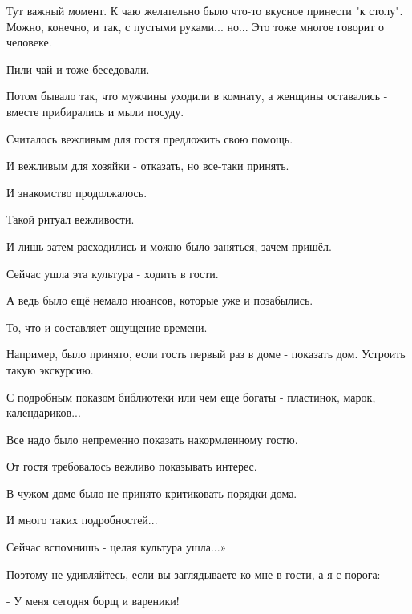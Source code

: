 Тут важный момент. К чаю желательно было что-то вкусное принести "к столу".
Можно, конечно, и так, с пустыми руками... но... Это тоже многое говорит о
человеке.

Пили чай и тоже беседовали.

Потом бывало так, что мужчины уходили в комнату, а женщины оставались - вместе
прибирались и мыли посуду.

Считалось вежливым для гостя предложить свою помощь.

И вежливым для хозяйки - отказать, но все-таки принять.

И знакомство продолжалось.

Такой ритуал вежливости.

И лишь затем расходились и можно было заняться, зачем пришёл.

Сейчас ушла эта культура - ходить в гости.

А ведь было ещё немало нюансов, которые уже и позабылись.

То, что и составляет ощущение времени.

Например, было принято, если гость первый раз в доме - показать дом. Устроить
такую экскурсию. 

С подробным показом библиотеки или чем еще богаты - пластинок, марок,
календариков...

Все надо было непременно показать накормленному гостю.

От гостя требовалось вежливо показывать интерес.

В чужом доме было не принято критиковать порядки дома.

И много таких подробностей...

Сейчас вспомнишь - целая культура ушла...»

Поэтому не удивляйтесь, если вы заглядываете ко мне в гости, а я с порога: 

- У меня сегодня борщ и вареники!

